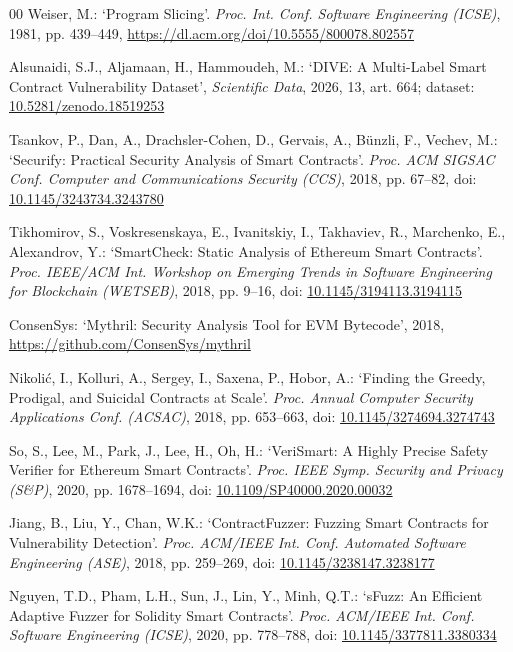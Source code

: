 \documentclass{ieeeaccess}
\begin{document}
\begin{thebibliography}{00}
Weiser, M.: `Program Slicing'. \textit{Proc. Int. Conf. Software Engineering (ICSE)}, 1981, pp. 439--449, \url{https://dl.acm.org/doi/10.5555/800078.802557}

Alsunaidi, S.J., Aljamaan, H., Hammoudeh, M.: `DIVE: A Multi-Label Smart Contract Vulnerability Dataset', \textit{Scientific Data}, 2026, 13, art. 664; dataset: \href{https://doi.org/10.5281/zenodo.18519253}{10.5281/zenodo.18519253}

Tsankov, P., Dan, A., Drachsler-Cohen, D., Gervais, A., B\"{u}nzli, F., Vechev, M.: `Securify: Practical Security Analysis of Smart Contracts'. \textit{Proc. ACM SIGSAC Conf. Computer and Communications Security (CCS)}, 2018, pp. 67--82, doi: \href{https://doi.org/10.1145/3243734.3243780}{10.1145/3243734.3243780}

Tikhomirov, S., Voskresenskaya, E., Ivanitskiy, I., Takhaviev, R., Marchenko, E., Alexandrov, Y.: `SmartCheck: Static Analysis of Ethereum Smart Contracts'. \textit{Proc. IEEE/ACM Int. Workshop on Emerging Trends in Software Engineering for Blockchain (WETSEB)}, 2018, pp. 9--16, doi: \href{https://doi.org/10.1145/3194113.3194115}{10.1145/3194113.3194115}

ConsenSys: `Mythril: Security Analysis Tool for EVM Bytecode', 2018, \url{https://github.com/ConsenSys/mythril}

Nikoli\'{c}, I., Kolluri, A., Sergey, I., Saxena, P., Hobor, A.: `Finding the Greedy, Prodigal, and Suicidal Contracts at Scale'. \textit{Proc. Annual Computer Security Applications Conf. (ACSAC)}, 2018, pp. 653--663, doi: \href{https://doi.org/10.1145/3274694.3274743}{10.1145/3274694.3274743}

So, S., Lee, M., Park, J., Lee, H., Oh, H.: `VeriSmart: A Highly Precise Safety Verifier for Ethereum Smart Contracts'. \textit{Proc. IEEE Symp. Security and Privacy (S\&P)}, 2020, pp. 1678--1694, doi: \href{https://doi.org/10.1109/SP40000.2020.00032}{10.1109/SP40000.2020.00032}

Jiang, B., Liu, Y., Chan, W.K.: `ContractFuzzer: Fuzzing Smart Contracts for Vulnerability Detection'. \textit{Proc. ACM/IEEE Int. Conf. Automated Software Engineering (ASE)}, 2018, pp. 259--269, doi: \href{https://doi.org/10.1145/3238147.3238177}{10.1145/3238147.3238177}

Nguyen, T.D., Pham, L.H., Sun, J., Lin, Y., Minh, Q.T.: `sFuzz: An Efficient Adaptive Fuzzer for Solidity Smart Contracts'. \textit{Proc. ACM/IEEE Int. Conf. Software Engineering (ICSE)}, 2020, pp. 778--788, doi: \href{https://doi.org/10.1145/3377811.3380334}{10.1145/3377811.3380334}


\end{thebibliography}
\end{document}
